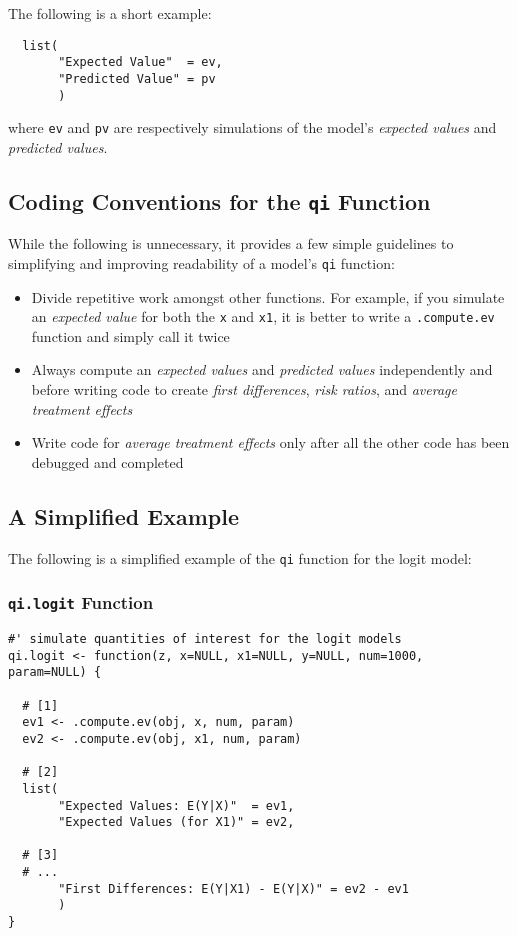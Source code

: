\documentclass{article}
\newcommand{\code}[1]{{\tt #1}}
\begin{document}
The following is a short example:

\begin{verbatim}
  list(
       "Expected Value"  = ev,
       "Predicted Value" = pv
       )
\end{verbatim}

\noindent where \code{ev} and \code{pv} are respectively simulations of the model's
\emph{expected values} and \emph{predicted values}.

\subsection{Coding Conventions for the \code{qi} Function}

While the following is unnecessary, it provides a few simple guidelines to simplifying
and improving readability of a model's \code{qi} function:

\begin{itemize}

	\item Divide repetitive work amongst other functions. For example, if you simulate
		an \emph{expected value} for both the \code{x} and \code{x1}, it is better to 
		write a \code{.compute.ev} function and simply call it twice
		
	\item Always compute an \emph{expected values} and \emph{predicted values} independently
		and before writing code to create \emph{first differences}, \emph{risk ratios}, and
		\emph{average treatment effects}
		
	\item Write code for \emph{average treatment effects} only after all the other code has
		been debugged and completed

\end{itemize}

\pagebreak
\subsection{A Simplified Example}

The following is a simplified example of the \code{qi} function for the logit model:


\subsubsection{\code{qi.logit} Function}
\begin{verbatim}
#' simulate quantities of interest for the logit models
qi.logit <- function(z, x=NULL, x1=NULL, y=NULL, num=1000,
param=NULL) {

  # [1]
  ev1 <- .compute.ev(obj, x, num, param)
  ev2 <- .compute.ev(obj, x1, num, param)

  # [2]
  list(
       "Expected Values: E(Y|X)"  = ev1,
       "Expected Values (for X1)" = ev2,
       
  # [3]
  # ...
       "First Differences: E(Y|X1) - E(Y|X)" = ev2 - ev1
       )
}
\end{verbatim}
\end{document}
